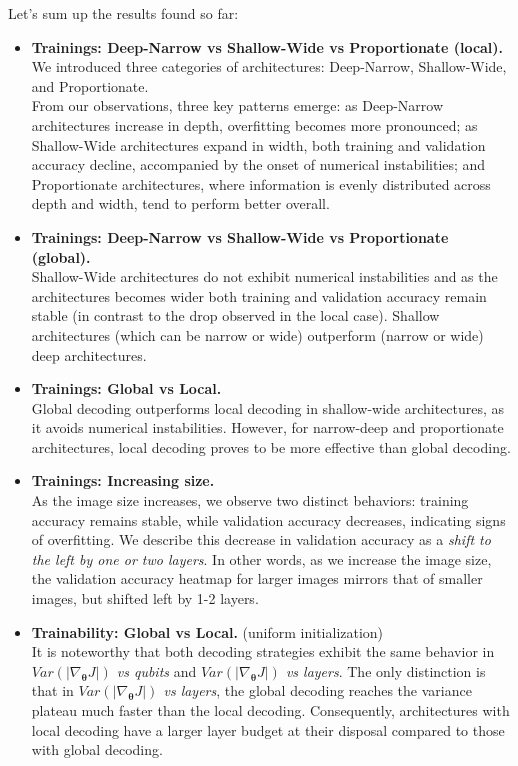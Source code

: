 

Let's sum up the results found so far:

\begin{itemize}
    \item \textbf{Trainings: Deep-Narrow vs Shallow-Wide vs Proportionate (local).}\\
    We introduced three categories of architectures: Deep-Narrow, Shallow-Wide, and Proportionate. \\
    From our observations, three key patterns emerge: as Deep-Narrow architectures increase in depth, 
    overfitting becomes more pronounced; as Shallow-Wide architectures expand in width, both training and 
    validation accuracy decline, accompanied by the onset of numerical instabilities; and Proportionate 
    architectures, where information is evenly distributed across depth and width, tend to perform better overall.

    \item \textbf{Trainings: Deep-Narrow vs Shallow-Wide vs Proportionate (global).}\\
    Shallow-Wide architectures do not exhibit numerical instabilities and as the architectures
    becomes wider both training and validation accuracy remain stable (in contrast to the drop observed in 
    the local case).
    Shallow architectures (which can be narrow or wide) outperform (narrow or wide) deep architectures.

    \item \textbf{Trainings: Global vs Local.}\\
    Global decoding outperforms local decoding in shallow-wide architectures, as it avoids numerical instabilities. 
    However, for narrow-deep and proportionate architectures, local decoding proves to be more effective 
    than global decoding.

    \item \textbf{Trainings: Increasing size.}\\
    As the image size increases, we observe two distinct behaviors: training accuracy remains stable, 
    while validation accuracy decreases, indicating signs of overfitting. We describe this decrease 
    in validation accuracy as a \textit{shift to the left by one or two layers}. In other words, 
    as we increase the image size, the validation accuracy heatmap for larger images mirrors that of smaller 
    images, but shifted left by 1-2 layers.

    \item \textbf{Trainability: Global vs Local.} (uniform initialization)\\
    It is noteworthy that both decoding strategies exhibit the same behavior in 
    \textit{$Var(|\nabla_{\bm{\theta}}J|)$ vs qubits} and \textit{$Var(|\nabla_{\bm{\theta}}J|)$ vs layers}.
    The only distinction is that in \textit{$Var(|\nabla_{\bm{\theta}}J|)$ vs layers}, the global decoding 
    reaches the variance plateau much faster than the local decoding. Consequently, architectures with 
    local decoding have a larger layer budget at their disposal compared to those with global decoding.


\end{itemize}